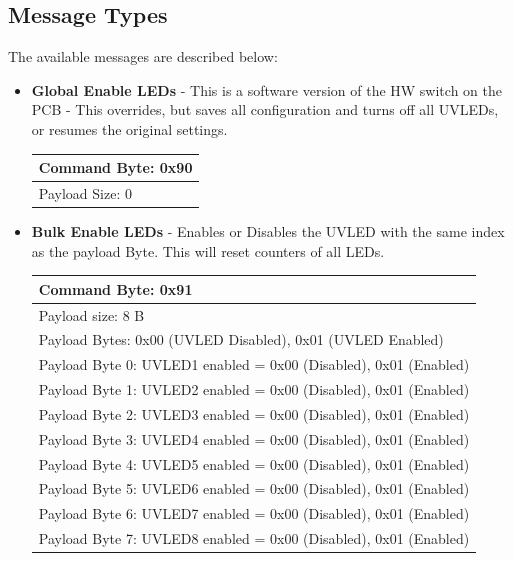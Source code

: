 \documentclass[12pt, a4paper]{article}
\begin{document}
\subsection{Message Types}
The available messages are described below:\\
\begin{itemize}
\item \textbf{Global Enable LEDs} - This is a software version of the HW switch on the PCB - This overrides, but saves all configuration and turns off all UVLEDs, or resumes the original settings.\\
\begin{flushleft}
\begin{tabular}{|l|}
\hline
Command Byte: 0x90													\\ \hline
Payload Size: 0														\\ \hline
\end{tabular}
\end{flushleft}

\item \textbf{Bulk Enable LEDs} - Enables or Disables the UVLED with the same index as the payload Byte. This will reset counters of all LEDs.\\
\begin{flushleft}
\begin{tabular}{|l|}
\hline
Command Byte: 0x91													\\ \hline
Payload size: 8 B													\\ \hline
Payload Bytes: 0x00 (UVLED Disabled), 0x01 (UVLED Enabled)			\\ \hline
Payload Byte 0: UVLED1 enabled =  0x00 (Disabled), 0x01 (Enabled)	\\ \hline
Payload Byte 1: UVLED2 enabled =  0x00 (Disabled), 0x01 (Enabled)	\\ \hline
Payload Byte 2: UVLED3 enabled =  0x00 (Disabled), 0x01 (Enabled)	\\ \hline
Payload Byte 3: UVLED4 enabled =  0x00 (Disabled), 0x01 (Enabled)	\\ \hline
Payload Byte 4: UVLED5 enabled =  0x00 (Disabled), 0x01 (Enabled)	\\ \hline
Payload Byte 5: UVLED6 enabled =  0x00 (Disabled), 0x01 (Enabled)	\\ \hline
Payload Byte 6: UVLED7 enabled =  0x00 (Disabled), 0x01 (Enabled)	\\ \hline
Payload Byte 7: UVLED8 enabled =  0x00 (Disabled), 0x01 (Enabled)	\\ \hline
\end{tabular}
\end{flushleft}


\end{itemize}
\end{document}
